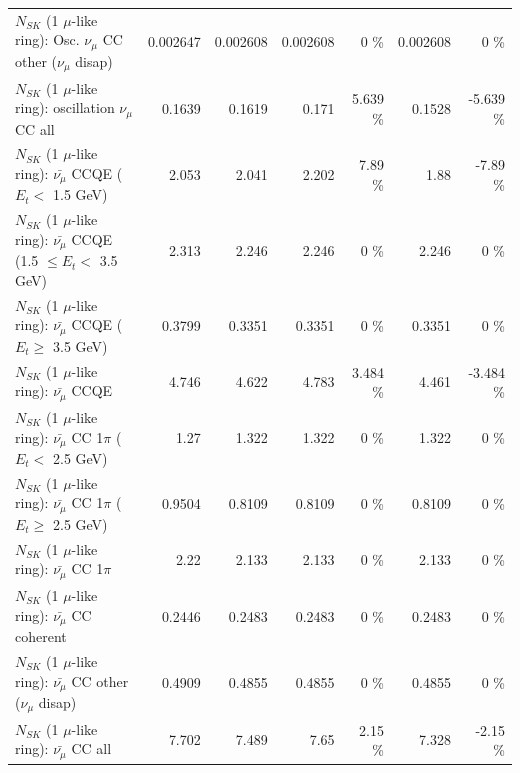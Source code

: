 \begin{table}
\begin{tabular}{| l | r | r | r  r | r  r |}
         $N_{SK}$ (1 $\mu$-like ring): Osc. $\nu_\mu$ CC other ($\nu_\mu$ disap) &        0.002647 &        0.002608 &        0.002608 &        0 \%  &        0.002608 &        0 \%  \\ 
                      $N_{SK}$ (1 $\mu$-like ring): oscillation $\nu_\mu$ CC all &          0.1639 &          0.1619 &           0.171 &    5.639 \%  &          0.1528 &   -5.639 \%  \\ 
\hline
\hline
          $N_{SK}$ (1 $\mu$-like ring): $\bar{\nu_\mu}$ CCQE ($E_{t} <$ 1.5 GeV) &           2.053 &           2.041 &           2.202 &     7.89 \%  &            1.88 &    -7.89 \%  \\ 
 $N_{SK}$ (1 $\mu$-like ring): $\bar{\nu_\mu}$ CCQE (1.5 $\leq E_{t} <$ 3.5 GeV) &           2.313 &           2.246 &           2.246 &        0 \%  &           2.246 &        0 \%  \\ 
       $N_{SK}$ (1 $\mu$-like ring): $\bar{\nu_\mu}$ CCQE ($E_{t} \geq$ 3.5 GeV) &          0.3799 &          0.3351 &          0.3351 &        0 \%  &          0.3351 &        0 \%  \\ 
\hline
                              $N_{SK}$ (1 $\mu$-like ring): $\bar{\nu_\mu}$ CCQE &           4.746 &           4.622 &           4.783 &    3.484 \%  &           4.461 &   -3.484 \%  \\ 
\hline
     $N_{SK}$ (1 $\mu$-like ring): $\bar{\nu_\mu}$ CC 1$\pi$ ($E_{t} <$ 2.5 GeV) &            1.27 &           1.322 &           1.322 &        0 \%  &           1.322 &        0 \%  \\ 
  $N_{SK}$ (1 $\mu$-like ring): $\bar{\nu_\mu}$ CC 1$\pi$ ($E_{t} \geq$ 2.5 GeV) &          0.9504 &          0.8109 &          0.8109 &        0 \%  &          0.8109 &        0 \%  \\ 
\hline
                         $N_{SK}$ (1 $\mu$-like ring): $\bar{\nu_\mu}$ CC 1$\pi$ &            2.22 &           2.133 &           2.133 &        0 \%  &           2.133 &        0 \%  \\ 
                       $N_{SK}$ (1 $\mu$-like ring): $\bar{\nu_\mu}$ CC coherent &          0.2446 &          0.2483 &          0.2483 &        0 \%  &          0.2483 &        0 \%  \\ 
        $N_{SK}$ (1 $\mu$-like ring): $\bar{\nu_\mu}$ CC other ($\nu_\mu$ disap) &          0.4909 &          0.4855 &          0.4855 &        0 \%  &          0.4855 &        0 \%  \\ 
                          $N_{SK}$ (1 $\mu$-like ring): $\bar{\nu_{\mu}}$ CC all &           7.702 &           7.489 &            7.65 &     2.15 \%  &           7.328 &    -2.15 \%  \\ 

\end{tabular}
\end{table}
